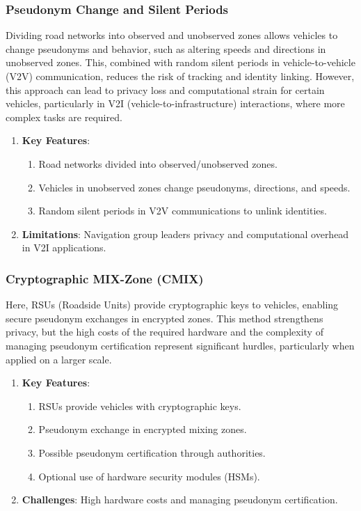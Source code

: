 \subsubsection{Pseudonym Change and Silent Periods}
Dividing road networks into observed and unobserved zones allows vehicles to change pseudonyms and behavior, such as altering speeds and directions in unobserved zones.
This, combined with random silent periods in vehicle-to-vehicle (V2V) communication, reduces the risk of tracking and identity linking.
However, this approach can lead to privacy loss and computational strain for certain vehicles, particularly in V2I (vehicle-to-infrastructure) interactions, where more complex tasks are required.

\begin{enumerate}
    \item \textbf{Key Features}:
    \begin{enumerate}
        \item Road networks divided into observed/unobserved zones.
        \item Vehicles in unobserved zones change pseudonyms, directions, and speeds.
        \item Random silent periods in V2V communications to unlink identities.
    \end{enumerate}
    \item \textbf{Limitations}: Navigation group leaders privacy and computational overhead in V2I applications.
\end{enumerate}

\subsubsection{Cryptographic MIX-Zone (CMIX)}
Here, RSUs (Roadside Units) provide cryptographic keys to vehicles, enabling secure pseudonym exchanges in encrypted zones.
This method strengthens privacy, but the high costs of the required hardware and the complexity of managing pseudonym certification represent significant hurdles, particularly when applied on a larger scale.
\begin{enumerate}
    \item \textbf{Key Features}:
    \begin{enumerate}
        \item RSUs provide vehicles with cryptographic keys.
        \item Pseudonym exchange in encrypted mixing zones.
        \item Possible pseudonym certification through authorities.
        \item Optional use of hardware security modules (HSMs).
    \end{enumerate}
    \item \textbf{Challenges}: High hardware costs and managing pseudonym certification.
\end{enumerate}

